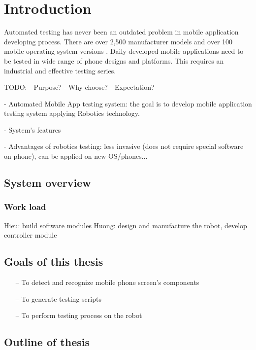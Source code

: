 \chapter{Introduction}

Automated testing has never been an outdated problem in mobile application developing process. There are over 2,500 manufacturer models and over 100 mobile operating system versions \nocite{crittercism}. Daily developed mobile applications need to be tested in wide range of phone designs and platforms. This requires an industrial and effective testing series.


TODO:
- Purpose?
- Why choose?
- Expectation?

- Automated Mobile App testing system: the goal is to develop mobile application testing system applying Robotics technology.

- System's features

- Advantages of robotics testing: less invasive (does not require special software on phone), can be applied on new OS/phones...

\section{System overview}

\subsection{Work load}
Hieu: build software modules
Huong: design and manufacture the robot, develop controller module

\section{Goals of this thesis}
	\begin{itemize}
		\item[--] To detect and recognize mobile phone screen's components
		\item[--] To generate testing scripts
		\item[--] To perform testing process on the robot
	\end{itemize}

\section{Outline of thesis}
